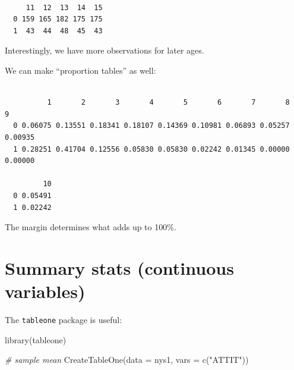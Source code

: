 \documentclass[
  letterpaper,
  DIV=11,
  numbers=noendperiod]{scrreprt}
\newenvironment{Shaded}{\begin{snugshade}}{\end{snugshade}}
\newcommand{\AttributeTok}[1]{\textcolor[rgb]{0.49,0.56,0.16}{#1}}
\newcommand{\CommentTok}[1]{\textcolor[rgb]{0.38,0.63,0.69}{\textit{#1}}}
\newcommand{\DecValTok}[1]{\textcolor[rgb]{0.25,0.63,0.44}{#1}}
\newcommand{\FunctionTok}[1]{\textcolor[rgb]{0.02,0.16,0.49}{#1}}
\newcommand{\NormalTok}[1]{\textcolor[rgb]{0.00,0.44,0.13}{#1}}
\newcommand{\SpecialCharTok}[1]{\textcolor[rgb]{0.25,0.44,0.63}{#1}}
\newcommand{\StringTok}[1]{\textcolor[rgb]{0.25,0.44,0.63}{#1}}
\begin{document}
\begin{Shaded}
\end{Shaded}

\begin{verbatim}
   
     11  12  13  14  15
  0 159 165 182 175 175
  1  43  44  48  45  43
\end{verbatim}

Interestingly, we have more observations for later ages.

We can make ``proportion tables'' as well:

\begin{Shaded}
\end{Shaded}

\begin{verbatim}
   
          1       2       3       4       5       6       7       8       9
  0 0.06075 0.13551 0.18341 0.18107 0.14369 0.10981 0.06893 0.05257 0.00935
  1 0.28251 0.41704 0.12556 0.05830 0.05830 0.02242 0.01345 0.00000 0.00000
   
         10
  0 0.05491
  1 0.02242
\end{verbatim}

The margin determines what adds up to 100\%.

\hypertarget{summary-stats-continuous-variables}{%
\section{Summary stats (continuous
variables)}\label{summary-stats-continuous-variables}}

The \texttt{tableone} package is useful:

\begin{Shaded}
\begin{Highlighting}[]
  \FunctionTok{library}\NormalTok{(tableone)}
  
\CommentTok{\# sample mean  }
  \FunctionTok{CreateTableOne}\NormalTok{(}\AttributeTok{data =}\NormalTok{ nys1,}
                 \AttributeTok{vars =} \FunctionTok{c}\NormalTok{(}\StringTok{"ATTIT"}\NormalTok{))}
\end{Highlighting}
\end{Shaded}
\end{document}
